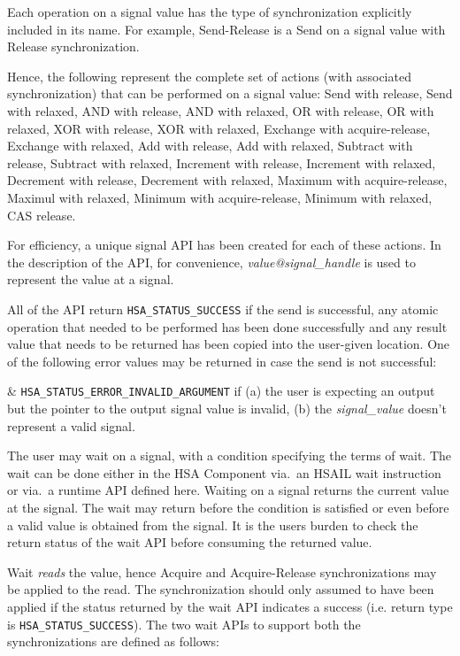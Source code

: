 Each operation on a signal value has the type of synchronization
explicitly included in its name. For example, Send-Release is a Send
on a signal value with Release synchronization.

Hence, the following represent the complete set of actions (with
associated synchronization) that can be performed on a signal value:
Send with release, 
Send with relaxed,
AND with release,
AND with relaxed,
OR with release,
OR with relaxed,
XOR with release,
XOR with relaxed,
Exchange with acquire-release,
Exchange with relaxed,
Add with release,
Add with relaxed,
Subtract with release,
Subtract with relaxed,
Increment with release,
Increment with relaxed,
Decrement with release,
Decrement with relaxed,
Maximum with acquire-release,
Maximul with relaxed,
Minimum with acquire-release,
Minimum with relaxed,
CAS release.

For efficiency, a unique signal API has been created for each of
these actions. In the description of the API, for convenience, 
\emph{value@signal\_handle} is used to represent the value at a
signal. 



All of the  API return
\texttt{HSA\_STATUS\_SUCCESS} if the send is successful, any atomic
operation that needed to be performed has been done successfully and
any result value that needs to be returned has been copied into the
user-given location. One of the following error values may be
returned in case the send is not successful:

\begin{easylist}
& \texttt{HSA\_STATUS\_ERROR\_INVALID\_ARGUMENT} if (a) the user is
expecting an output but the pointer to the output signal value is
invalid, (b) the {\itshape signal\_value} doesn't represent a valid
signal.
\end{easylist}

The user may wait on a signal, with a condition specifying the terms
of wait. The wait can be done either in the HSA Component via.\ an
HSAIL wait instruction or via.\ a runtime API defined here. 
Waiting on a signal returns the current value at the signal. The
wait may return before the condition is satisfied or even before a
valid value is obtained from the signal. It is the users burden to
check the return status of the wait API before consuming the
returned value. 

Wait \emph{reads} the value, hence Acquire and Acquire-Release
synchronizations may be applied to the read. The synchronization
should only assumed to have been applied if the status returned by
the wait API indicates a success (i.e. return type is
\texttt{HSA\_STATUS\_SUCCESS}). The two wait APIs to support both the
synchronizations are defined as follows:


